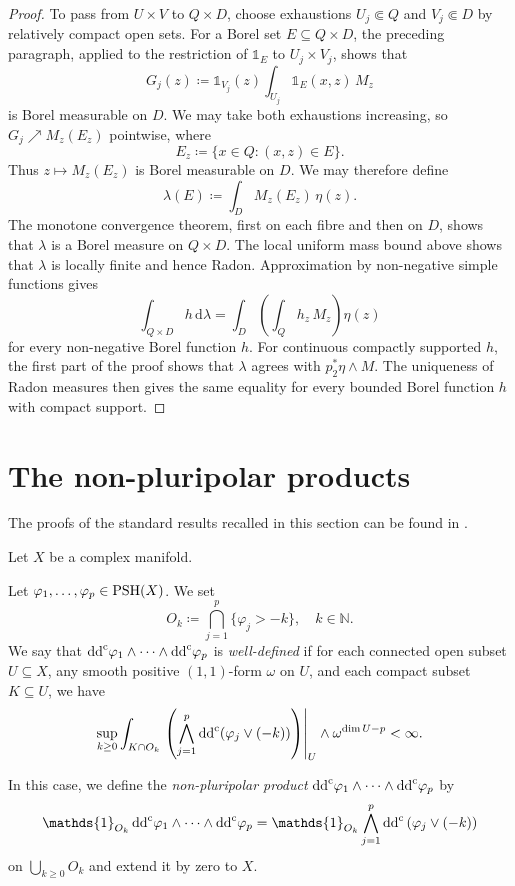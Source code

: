 \begin{proof}
    To pass from $U\times V$ to $Q\times D$, choose exhaustions $U_j\Subset Q$ and $V_j\Subset D$ by relatively compact open sets. For a Borel set $E\subseteq Q\times D$, the preceding paragraph, applied to the restriction of $\mathds{1}_E$ to $U_j\times V_j$, shows that
    \[
        G_j(z)\coloneqq
        \mathds{1}_{V_j}(z)\int_{U_j}\mathds{1}_E(x,z)\,M_z
    \]
    is Borel measurable on $D$. We may take both exhaustions increasing, so $G_j\nearrow M_z(E_z)$ pointwise, where
    \[
        E_z\coloneqq\{x\in Q:(x,z)\in E\}.
    \]
    Thus $z\mapsto M_z(E_z)$ is Borel measurable on $D$.
    We may therefore define
    \[
        \lambda(E)\coloneqq\int_D M_z(E_z)\,\eta(z).
    \]
    The monotone convergence theorem, first on each fibre and then on $D$, shows that $\lambda$ is a Borel measure on $Q\times D$. The local uniform mass bound above shows that $\lambda$ is locally finite and hence Radon. Approximation by non-negative simple functions gives
    \[
        \int_{Q\times D}h\,\mathrm{d}\lambda
        =\int_D\left(\int_Qh_z\,M_z\right)\eta(z)
    \]
    for every non-negative Borel function $h$. For continuous compactly supported $h$, the first part of the proof shows that $\lambda$ agrees with $p_2^*\eta\wedge M$. The uniqueness of Radon measures then gives the same equality for every bounded Borel function $h$ with compact support.
\end{proof}

\section{The non-pluripolar products}\label{sec:npp}
The proofs of the standard results recalled in this section can be found in \cite{BEGZ10}.

Let $X$ be a complex manifold.

\begin{definition}\label{def:npp:L69}
Let $\varphi_1,\ldots,\varphi_p\in \mathrm{PSH}(X)$. We set
\[
O_k \coloneqq \bigcap_{j=1}^p \{\varphi_j>-k\},\quad k\in \mathbb{N}.
\]
We say that $\mathrm{dd}^{\mathrm{c}} \varphi_1\wedge\cdots\wedge \mathrm{dd}^{\mathrm{c}} \varphi_p$ is \emph{well-defined} if for each connected open subset $U\subseteq X$, any smooth positive $(1,1)$-form $\omega$ on $U$, and each compact subset $K\subseteq U$, we have
\begin{equation}\label{eq:welldefinepluri}
\sup_{k\geq 0} \int_{K\cap O_k}\left.\left(\bigwedge_{j=1}^p \mathrm{dd}^{\mathrm{c}} (\varphi_j\lor (-k))\right)\right|_U\wedge \omega^{\dim U-p}<\infty.
\end{equation}

In this case, we define the \emph{non-pluripolar product}  $\mathrm{dd}^{\mathrm{c}} \varphi_1\wedge\cdots\wedge \mathrm{dd}^{\mathrm{c}} \varphi_p$ by
\begin{equation}\label{eq:npp}
\mathds{1}_{O_k}\,\ddc \varphi_1\wedge\cdots\wedge \ddc \varphi_p=\mathds{1}_{O_k}\bigwedge_{j=1}^p \ddc  \left( \varphi_j\lor (-k)\right)
\end{equation}
on $\bigcup_{k\geq 0} O_k$ and extend it by zero to $X$.
\end{definition}

